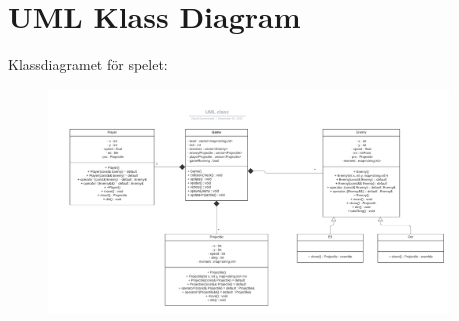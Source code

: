 \documentclass{TDP005mall}
\begin{document}
\section{UML Klass Diagram}
Klassdiagramet för spelet:
\begin{figure}[H]
  \begin{center}
    \includegraphics[width=0.95\textwidth]{UML class.png}
  \end{center}
  \caption{}
  \label{fig:}
\end{figure}
\end{document}
